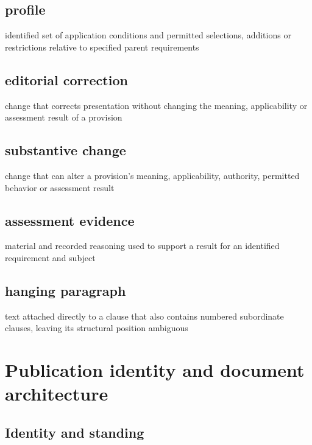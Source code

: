 \documentclass[11pt,a4paper]{article}
\begin{document}
\subsection{profile}
identified set of application conditions and permitted selections, additions or restrictions relative to specified parent requirements

\subsection{editorial correction}
change that corrects presentation without changing the meaning, applicability or assessment result of a provision

\subsection{substantive change}
change that can alter a provision's meaning, applicability, authority, permitted behavior or assessment result

\subsection{assessment evidence}
material and recorded reasoning used to support a result for an identified requirement and subject

\subsection{hanging paragraph}
text attached directly to a clause that also contains numbered subordinate clauses, leaving its structural position ambiguous

\section{Publication identity and document architecture}
\subsection{Identity and standing}
\end{document}
